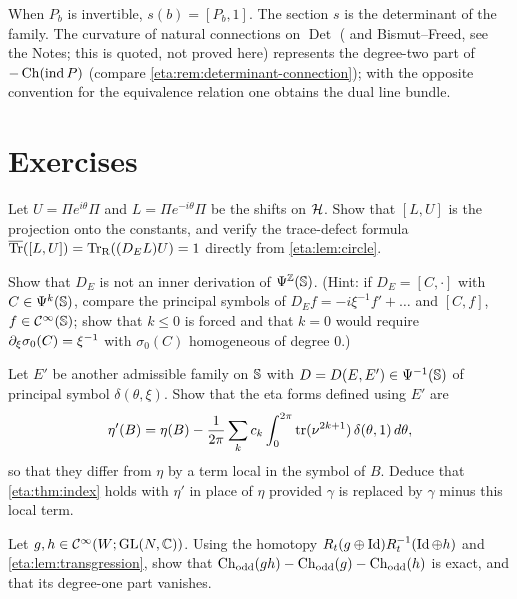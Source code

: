 When $P_b$ is invertible, $s(b)=[P_b,1]$. The section $s$ is the determinant of the family.
The curvature of natural connections on $\operatorname{Det}$ (\cite{Quillen} and
Bismut--Freed, see the Notes; this is quoted, not proved here)
represents the degree-two part of $-\operatorname{Ch}(\operatorname{ind} P)$ (compare
\cref{eta:rem:determinant-connection}); with the opposite convention for the
equivalence relation one obtains the dual line bundle.

\section{Exercises}\label{eta:sec:exercises}

\begin{exercise}\label{eta:ex:defect-shift}
Let $U=\Pi e^{i\theta}\Pi$ and $L=\Pi e^{-i\theta}\Pi$ be the shifts on $\mathcal{H}$. Show
that $[L,U]$ is the projection onto the constants, and verify the trace-defect formula
$\overline{\operatorname{Tr}}([L,U])=\operatorname{Tr}_{\mathrm{R}}((D_EL)U)=1$ directly from \cref{eta:lem:circle}.
\end{exercise}

\begin{exercise}\label{eta:ex:not-inner}
Show that $D_E$ is not an inner derivation of $\Psi^{\mathbb{Z}}(\mathbb{S})$. (Hint: if
$D_E=[C,\cdot]$ with $C\in\Psi^{k}(\mathbb{S})$, compare the principal symbols of
$D_Ef=-i\xi^{-1}f'+\dots$ and $[C,f]$, $f\in\mathcal{C}^\infty(\mathbb{S})$; show that $k\le0$ is forced and
that $k=0$ would require $\partial_\xi\sigma_0(C)=\xi^{-1}$ with $\sigma_0(C)$ homogeneous of
degree $0$.)
\end{exercise}

\begin{exercise}\label{eta:ex:change-eta}
Let $E'$ be another admissible family on $\mathbb{S}$ with $D=D(E,E')\in\Psi^{-1}(\mathbb{S})$ of
principal symbol $\delta(\theta,\xi)$. Show that the eta forms defined using $E'$ are
\[
\eta'(B)=\eta(B)-\frac1{2\pi}\sum_kc_k\int_0^{2\pi}\operatorname{tr}(\nu^{2k+1})\,\delta(\theta,1)\,d\theta,
\]
so that they differ from $\eta$ by a term local in the symbol of $B$. Deduce that
\cref{eta:thm:index} holds with $\eta'$ in place of $\eta$ provided $\gamma$ is replaced by
$\gamma$ minus this local term.
\end{exercise}

\begin{exercise}\label{eta:ex:chodd-product}
Let $g,h\in\mathcal{C}^\infty(W;\operatorname{GL}(N,\mathbb{C}))$. Using the homotopy
$R_t(g\oplus\operatorname{Id})R_t^{-1}(\operatorname{Id}\oplus h)$ and \cref{eta:lem:transgression}, show that
$\operatorname{Ch}_{\mathrm{odd}}(gh)-\operatorname{Ch}_{\mathrm{odd}}(g)-\operatorname{Ch}_{\mathrm{odd}}(h)$ is exact, and that its degree-one part vanishes.
\end{exercise}

